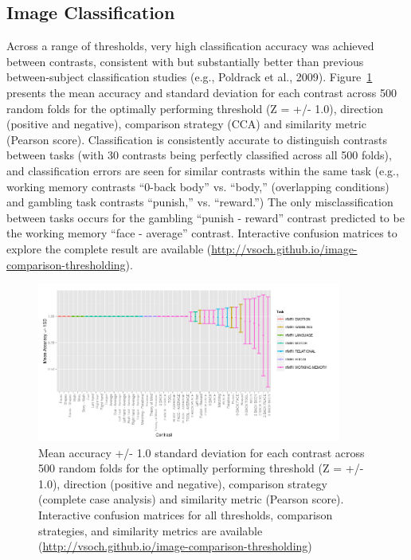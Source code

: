 \documentclass{report}
\begin{document}
\subsection{Image Classification}

Across a range of thresholds, very high classification accuracy was
achieved between contrasts, consistent with but substantially better
than previous between-subject classification studies (e.g., Poldrack et
al., 2009). Figure~\ref{fig:25} presents the mean accuracy and standard deviation
for each contrast across 500 random folds for the optimally performing
threshold (Z = +/- 1.0), direction (positive and negative), comparison
strategy (CCA) and similarity metric (Pearson score). Classification is
consistently accurate to distinguish contrasts between tasks (with 30
contrasts being perfectly classified across all 500 folds), and
classification errors are seen for similar contrasts within the same
task (e.g., working memory contrasts ``0-back body'' vs. ``body,''
(overlapping conditions) and gambling task contrasts ``punish,'' vs.
``reward.'') The only misclassification between tasks occurs for the
gambling ``punish - reward'' contrast predicted to be the working memory
``face - average'' contrast. Interactive confusion matrices to explore
the complete result are available
(\href{http://vsoch.github.io/image-comparison-thresholding}{http://vsoch.github.io/image-comparison-thresholding}).

\begin{figure}[h!]
\begin{center}
\includegraphics[width=10cm]{images/figure25.png}
\end{center}
\caption{ \label{fig:25} Mean accuracy +/- 1.0 standard deviation for each contrast across 500 random folds for the optimally performing threshold (Z = +/- 1.0), direction (positive and negative), comparison strategy (complete case analysis) and similarity metric (Pearson score). Interactive confusion matrices for all thresholds, comparison strategies, and similarity metrics are available (\href{http://vsoch.github.io/image-comparison-thresholding}{http://vsoch.github.io/image-comparison-thresholding})
\newline \newline}
\end{figure} 
\end{document}
